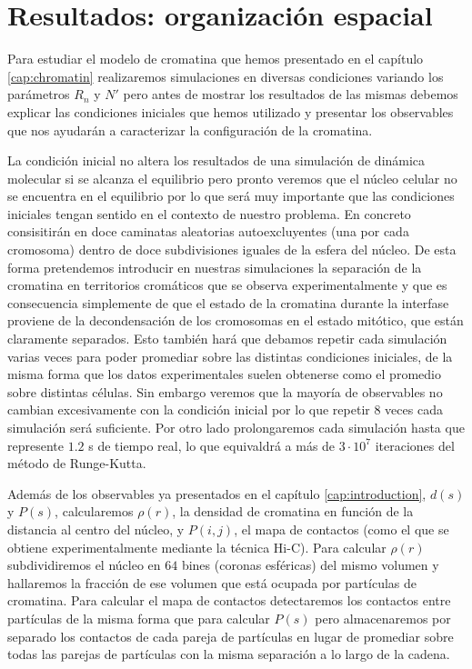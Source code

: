 \chapter{Resultados: organización espacial}
\label{cap:results}

Para estudiar el modelo de cromatina que hemos presentado en el capítulo \ref{cap:chromatin} realizaremos simulaciones en diversas condiciones variando los parámetros $R_n$ y $N'$ pero antes de mostrar los resultados de las mismas debemos explicar las condiciones iniciales que hemos utilizado y presentar los observables que nos ayudarán a caracterizar la configuración de la cromatina.

La condición inicial no altera los resultados de una simulación de dinámica molecular si se alcanza el equilibrio pero pronto veremos que el núcleo celular no se encuentra en el equilibrio por lo que será muy importante que las condiciones iniciales tengan sentido en el contexto de nuestro problema. En concreto consisitirán en doce caminatas aleatorias autoexcluyentes (una por cada cromosoma) dentro de doce subdivisiones iguales de la esfera del núcleo. De esta forma pretendemos introducir en nuestras simulaciones la separación de la cromatina en territorios cromáticos que se observa experimentalmente y que es consecuencia simplemente de que el estado de la cromatina durante la interfase proviene de la decondensación de los cromosomas en el estado mitótico, que están claramente separados. Esto también hará que debamos repetir cada simulación varias veces para poder promediar sobre las distintas condiciones iniciales, de la misma forma que los datos experimentales suelen obtenerse como el promedio sobre distintas células. Sin embargo veremos que la mayoría de observables no cambian excesivamente con la condición inicial por lo que repetir $8$ veces cada simulación será suficiente. Por otro lado prolongaremos cada simulación hasta que represente $1.2$ s de tiempo real, lo que equivaldrá a más de $3\cdot10^7$ iteraciones del método de Runge-Kutta.

Además de los observables ya presentados en el capítulo \ref{cap:introduction}, $d(s)$ y $P(s)$, calcularemos $\rho(r)$, la densidad de cromatina en función de la distancia al centro del núcleo, y $P(i,j)$, el mapa de contactos (como el que se obtiene experimentalmente mediante la técnica Hi-C). Para calcular $\rho(r)$ subdividiremos el núcleo en $64$ bines (coronas esféricas) del mismo volumen y hallaremos la fracción de ese volumen que está ocupada por partículas de cromatina. Para calcular el mapa de contactos detectaremos los contactos entre partículas de la misma forma que para calcular $P(s)$ pero almacenaremos por separado los contactos de cada pareja de partículas en lugar de promediar sobre todas las parejas de partículas con la misma separación a lo largo de la cadena.

